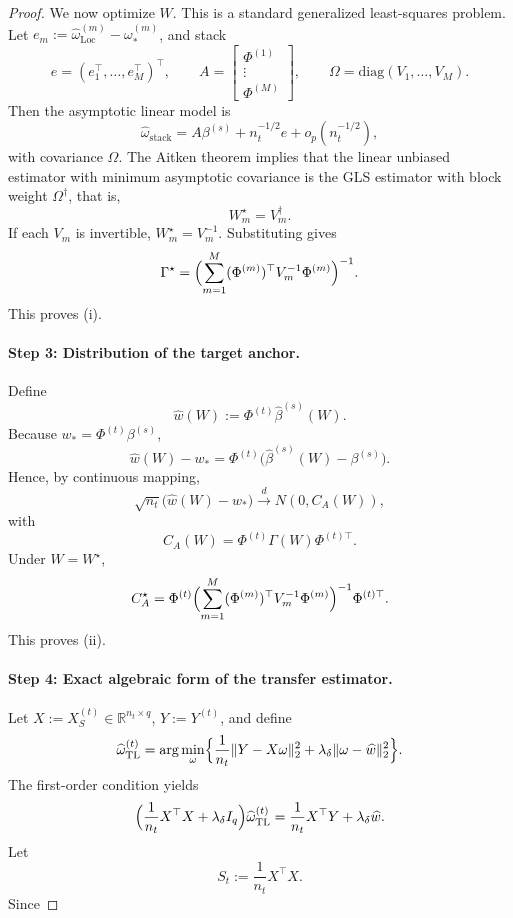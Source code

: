 \documentclass[11pt]{article}
\newcommand{\1}{\mathbf{1}}
\begin{document}
\begin{proof}
We now optimize \(W\). This is a standard generalized least-squares problem.
Let \(e_m:=\widehat\omega_{\mathrm{Loc}}^{(m)}-\omega_*^{(m)}\), and stack
\[
e=(e_1^\top,\dots,e_M^\top)^\top,\qquad
A=
\begin{bmatrix}
\Phi^{(1)}\\ \vdots\\ \Phi^{(M)}
\end{bmatrix},
\qquad
\Omega=\mathrm{diag}(V_1,\dots,V_M).
\]
Then the asymptotic linear model is
\[
\widehat\omega_{\mathrm{stack}}
=
A\beta^{(s)} + n_t^{-1/2}e + o_p(n_t^{-1/2}),
\]
with covariance \(\Omega\). The Aitken theorem implies that the linear unbiased estimator
with minimum asymptotic covariance is the GLS estimator with block weight \(\Omega^\dagger\),
that is,
\[
W_m^\star = V_m^\dagger.
\]
If each \(V_m\) is invertible, \(W_m^\star=V_m^{-1}\). Substituting gives
\[
\Gamma^\star
=
\Bigl(\sum_{m=1}^M (\Phi^{(m)})^\top V_m^{-1}\Phi^{(m)}\Bigr)^{-1}.
\]
This proves (i).

\paragraph{Step 3: Distribution of the target anchor.}
Define
\[
\widehat w(W):=\Phi^{(t)}\widehat\beta^{(s)}(W).
\]
Because \(w_*=\Phi^{(t)}\beta^{(s)}\),
\[
\widehat w(W)-w_*
=
\Phi^{(t)}\bigl(\widehat\beta^{(s)}(W)-\beta^{(s)}\bigr).
\]
Hence, by continuous mapping,
\[
\sqrt{n_t}\bigl(\widehat w(W)-w_*\bigr)
\overset{d}{\longrightarrow}
N(0,C_A(W)),
\]
with
\[
C_A(W)=\Phi^{(t)}\Gamma(W)\Phi^{(t)\top}.
\]
Under \(W=W^\star\),
\[
C_A^\star
=
\Phi^{(t)}
\Bigl(\sum_{m=1}^M (\Phi^{(m)})^\top V_m^{-1}\Phi^{(m)}\Bigr)^{-1}
\Phi^{(t)\top}.
\]
This proves (ii).

\paragraph{Step 4: Exact algebraic form of the transfer estimator.}
Let \(X:=X_S^{(t)}\in\mathbb R^{n_t\times q}\), \(Y:=Y^{(t)}\), and define
\[
\widehat\omega_{\mathrm{TL}}^{(t)}
=
\arg\min_\omega
\Bigl\{\frac1{n_t}\|Y-X\omega\|_2^2+\lambda_\delta\|\omega-\widehat w\|_2^2\Bigr\}.
\]
The first-order condition yields
\[
\Bigl(\frac1{n_t}X^\top X+\lambda_\delta I_q\Bigr)\widehat\omega_{\mathrm{TL}}^{(t)}
=
\frac1{n_t}X^\top Y+\lambda_\delta \widehat w.
\]
Let
\[
S_t:=\frac1{n_t}X^\top X.
\]
Since


\end{proof}
\end{document}
